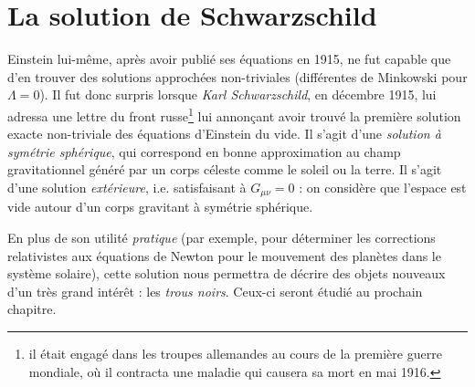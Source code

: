 \chapter{La solution de Schwarzschild}

Einstein lui-même, après avoir publié ses équations en 1915, ne fut capable que d'en trouver des solutions approchées non-triviales (différentes de Minkowski pour $\Lambda = 0$). Il fut donc surpris lorsque \emph{Karl Schwarzschild}, en décembre 1915, lui adressa une lettre du front russe\footnote{il était engagé dans les troupes allemandes au cours de la première guerre mondiale, où il contracta une maladie qui causera sa mort en mai 1916.} lui annonçant avoir trouvé la première solution exacte non-triviale des équations d'Einstein du vide. Il s'agit d'une \emph{solution à symétrie sphérique}, qui correspond en bonne approximation au champ gravitationnel généré par un corps céleste comme le soleil ou la terre. Il s'agit d'une solution \emph{extérieure}, i.e. satisfaisant à $G_{\mu\nu} = 0$ : on considère que l'espace est vide autour d'un corps gravitant à symétrie sphérique.

En plus de son utilité \emph{pratique} (par exemple, pour déterminer les corrections relativistes aux équations de Newton pour le mouvement des planètes dans le système solaire), cette solution nous permettra de décrire des objets nouveaux d'un très grand intérêt : les \emph{trous noirs}. Ceux-ci seront étudié au prochain chapitre.

